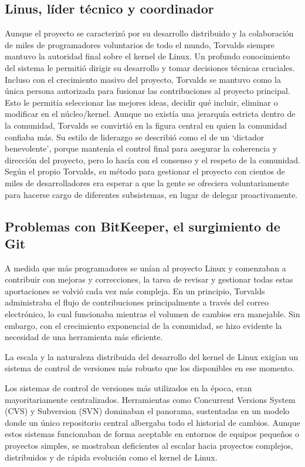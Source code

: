\documentclass[a4paper,12pt]{article}
\begin{document}
\subsection{Linus, líder técnico y coordinador}
Aunque el proyecto se caracterizó por su desarrollo distribuido y la
colaboración de miles de programadores voluntarios de todo el mundo, Torvalds
siempre mantuvo la autoridad final sobre el kernel de Linux.
Un profundo conocimiento del sistema le permitió dirigir su desarrollo y tomar
decisiones técnicas cruciales. Incluso con el crecimiento masivo del proyecto,
Torvalds se mantuvo como la única persona autorizada para fusionar las
contribuciones al proyecto principal. Esto le permitía seleccionar las mejores
ideas, decidir qué incluir, eliminar o modificar en el núcleo/kernel. 
Aunque no existía una jerarquía estricta dentro de la comunidad, Torvalds se
convirtió en la figura central en quien la comunidad confiaba más. Su estilo de
liderazgo se describió como el de un `dictador benevolente', porque mantenía el
control final para asegurar la coherencia y dirección del proyecto, pero lo
hacía con el consenso y el respeto de la comunidad. Según el propio Torvalds, su
método para gestionar el proyecto con cientos de miles de desarrolladores era
esperar a que la gente se ofreciera voluntariamente para hacerse cargo de
diferentes subsistemas, en lugar de delegar proactivamente.

\subsection{Problemas con BitKeeper, el surgimiento de Git}

A medida que más programadores se unían al proyecto Linux y comenzaban a
contribuir con mejoras y correcciones, la tarea de revisar y gestionar todas
estas aportaciones se volvió cada vez más compleja. En un principio,
Torvalds administraba el flujo de contribuciones principalmente a través del
correo electrónico, lo cual funcionaba mientras el volumen de cambios era
manejable. Sin embargo, con el crecimiento exponencial de la comunidad, se hizo
evidente la necesidad de una herramienta más eficiente.

La escala y la naturaleza distribuida del desarrollo del kernel de Linux exigían
un sistema de control de versiones más robusto que los disponibles en ese
momento.

Los sistemas de control de versiones más utilizados en la época,
eran mayoritariamente centralizados. Herramientas como Concurrent Versions
System (CVS) y Subversion (SVN) dominaban el panorama, sustentadas en un modelo
donde un único repositorio central albergaba todo el historial de cambios.
Aunque estos sistemas funcionaban de forma aceptable en entornos de equipos
pequeños o proyectos simples, se mostraban deficientes al escalar hacia
proyectos complejos, distribuidos y de rápida evolución como el kernel de Linux.
\end{document}
